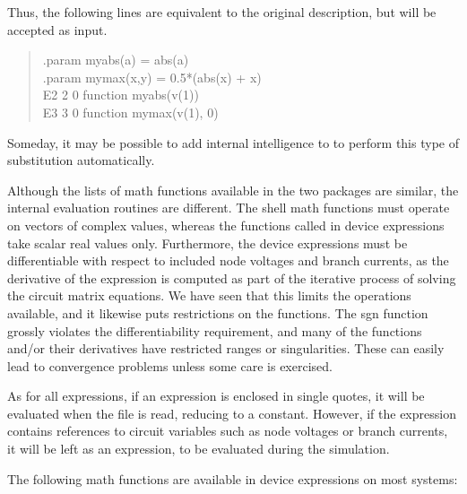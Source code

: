 Thus, the following lines are equivalent to the original
description, but will be accepted as {\WRspice} input.
\begin{quote}\vt
.param myabs(a) = abs(a)\\
.param mymax(x,y) = 0.5*(abs(x) + x)\\
E2 2 0 function myabs(v(1))\\
E3 3 0 function mymax(v(1), 0)
\end{quote}

Someday, it may be possible to add internal intelligence to {\WRspice}
to perform this type of substitution automatically.

Although the lists of math functions available in the two packages are
similar, the internal evaluation routines are different.  The shell
math functions must operate on vectors of complex values, whereas the
functions called in device expressions take scalar real values only. 
Furthermore, the device expressions must be differentiable with
respect to included node voltages and branch currents, as the
derivative of the expression is computed as part of the iterative
process of solving the circuit matrix equations.  We have seen that
this limits the operations available, and it likewise puts
restrictions on the functions.  The {\vt sgn} function grossly
violates the differentiability requirement, and many of the functions
and/or their derivatives have restricted ranges or singularities. 
These can easily lead to convergence problems unless some care is
exercised.

As for all expressions, if an expression is enclosed in single quotes,
it will be evaluated when the file is read, reducing to a constant. 
However, if the expression contains references to circuit variables
such as node voltages or branch currents, it will be left as an
expression, to be evaluated during the simulation.

The following math functions are available in device expressions
on most systems:


